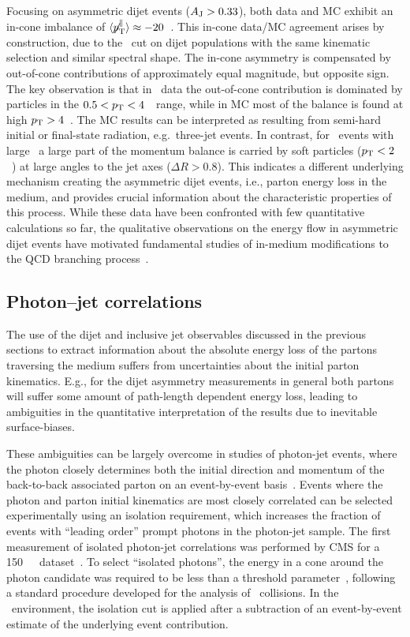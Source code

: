 Focusing on asymmetric dijet events ($A_\mathrm{J} > 0.33$), both data and MC exhibit an
in-cone imbalance of $\langle \displaystyle{\not} p_{\mathrm{T}}^{\parallel} \rangle \approx
-20$~\GeVc. This in-cone data/MC agreement arises by construction, due to the \AJ\ cut on
dijet populations with the same kinematic selection and similar spectral shape. The
in-cone asymmetry is compensated by out-of-cone contributions of approximately equal magnitude,
but opposite sign. The key observation is that in  \PbPb\ data the out-of-cone contribution
is dominated by particles in the $0.5 < \mbox{$p_{\mathrm{T}}$} < 4$~\GeVc\ range,
while in MC most of the balance is found at high $\mbox{$p_{\mathrm{T}}$} > 4$~\GeVc.
The MC results can be interpreted as resulting from semi-hard initial or final-state radiation,
e.g.\ three-jet events.
In contrast, for \PbPb\ events with large \AJ\ a large part of the momentum balance is
carried by soft particles ($\mbox{$p_{\mathrm{T}}$} < 2$~\GeVc) at large angles to the jet axes ($\Delta R > 0.8$).
This indicates a different underlying mechanism creating the asymmetric dijet events, i.e.,
parton energy loss in the medium, and provides crucial information about the characteristic
properties of this process. While these data have been confronted with few quantitative
calculations so far, the qualitative observations on the energy flow in asymmetric dijet
events have motivated fundamental studies of in-medium modifications to the
QCD branching process~\cite{Blaizot:2013vha,Blaizot:2013hx, Armesto:2013fca}.

\subsection{Photon--jet correlations}

The use of the dijet and inclusive jet observables discussed in the previous sections
to extract information about the absolute energy loss of the partons traversing the medium suffers from
uncertainties about the initial parton kinematics. E.g., for the dijet asymmetry
measurements in general both partons will suffer some amount of path-length dependent
energy loss, leading to ambiguities in the quantitative interpretation of the results
due to inevitable surface-biases.

These ambiguities can be largely overcome in studies of photon-jet events,
where the photon closely determines both the initial direction and momentum
of the back-to-back associated parton on an event-by-event basis~\cite{Wang:1996yh}.
Events where the photon and parton initial kinematics are most closely correlated
can be selected experimentally using an isolation requirement, which
increases the fraction of events with ``leading order'' prompt photons in
the photon-jet sample. The first measurement of isolated photon-jet correlations
was performed by CMS for a 150~\mubinv\ \PbPb\ dataset~\cite{Chatrchyan:2012gt}.
To select ``isolated photons'', the energy in a cone around
the photon candidate was required to be less than a threshold parameter~\cite{HIPhoton},
following a standard procedure developed for the analysis of \pp\ collisions. In the \PbPb\
environment, the isolation cut is applied after a subtraction of an event-by-event
estimate of the underlying event contribution.

